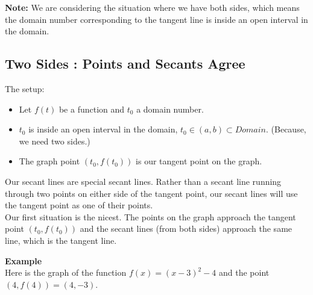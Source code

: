 \documentclass{ximera}
\begin{document}
\textbf{Note:} We are considering the situation where we have both sides, which means the domain number corresponding to the tangent line is inside an open interval in the domain. \\






















\subsection*{Two Sides : Points and Secants Agree}


The setup: \\

\begin{itemize}
     \item Let $f(t)$ be a function and $t_0$ a domain number. \\

     \item $t_0$ is inside an open interval in the domain, $t_0 \in (a, b) \subset Domain$. (Because, we need two sides.) \\

     \item The graph point $(t_0 , f(t_0))$ is our tangent point on the graph.
\end{itemize}


Our secant lines are special secant lines. Rather than a secant line running through two points on either side of the tangent point, our secant lines will use the tangent point as one of their points. \\ 



Our first situation is the nicest. The points on the graph approach the tangent point $(t_0 , f(t_0))$ and the secant lines (from both sides) approach the same line, which is the tangent line.



\textbf{\textcolor{blue!55!black}{Example}}  \\




Here is the graph of the function $f(x) = (x - 3)^2 - 4$ and the point $(4, f(4))= (4, -3)$. \\
\end{document}
